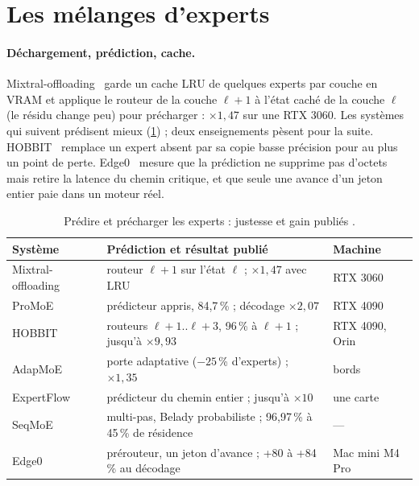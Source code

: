 \section{Les mélanges d'experts}\label{sec:moe-systemes}

\paragraph{Déchargement, prédiction, cache.} Mixtral-offloading~\cite{mixtraloffload2023} garde un cache LRU de quelques experts par couche en VRAM et applique le routeur de la couche $\ell+1$ à l'état caché de la couche $\ell$ (le résidu change peu) pour précharger : $\times 1{,}47$ sur une RTX 3060. Les systèmes qui suivent prédisent mieux (\cref{tab:prediction}) ; deux enseignements pèsent pour la suite. HOBBIT~\cite{hobbit2024} remplace un expert absent par sa copie basse précision pour au plus un point de perte. Edge0~\cite{edge0_2026} mesure que la prédiction ne supprime pas d'octets mais retire la latence du chemin critique, et que seule une avance d'un jeton entier paie dans un moteur réel.

\begin{table}[ht]
\centering\small
\caption[Prédire et précharger les experts]{Prédire et précharger les experts : justesse et gain publiés \litt.}
\label{tab:prediction}
\begin{tabularx}{\linewidth}{@{}lXl@{}}
\toprule
Système & Prédiction et résultat publié & Machine \\
\midrule
Mixtral-offloading~\cite{mixtraloffload2023} & routeur $\ell{+}1$ sur l'état $\ell$ ; $\times1{,}47$ avec LRU & RTX 3060 \\
ProMoE~\cite{promoe2024} & prédicteur appris, 84,7\,\% ; décodage $\times2{,}07$ & RTX 4090 \\
HOBBIT~\cite{hobbit2024} & routeurs $\ell{+}1..\ell{+}3$, 96\,\% à $\ell{+}1$ ; jusqu'à $\times9{,}93$ & RTX 4090, Orin \\
AdapMoE~\cite{adapmoe2024} & porte adaptative ($-25$\,\% d'experts) ; $\times1{,}35$ & bords \\
ExpertFlow~\cite{expertflow2024} & prédicteur du chemin entier ; jusqu'à $\times10$ & une carte \\
SeqMoE~\cite{seqmoe2026} & multi-pas, Belady probabiliste ; 96,97\,\% à 45\,\% de résidence & --- \\
Edge0~\cite{edge0_2026} & prérouteur, un jeton d'avance ; +80 à +84\,\% au décodage & Mac mini M4 Pro \\
\bottomrule
\end{tabularx}
\end{table}

